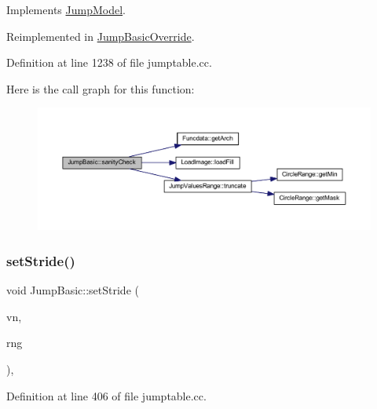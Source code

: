 Implements \mbox{\hyperlink{class_jump_model_a76a52bf3311e9d97a61d1117f6de1b0a}{Jump\+Model}}.



Reimplemented in \mbox{\hyperlink{class_jump_basic_override_a050d3faa295ff61d04f1406443ac83b1}{Jump\+Basic\+Override}}.



Definition at line 1238 of file jumptable.\+cc.

Here is the call graph for this function\+:
\nopagebreak
\begin{figure}[H]
\begin{center}
\leavevmode
\includegraphics[width=350pt]{class_jump_basic_a1cba6b6c963e4a70efc439c27e53bd44_cgraph}
\end{center}
\end{figure}
\mbox{\label{class_jump_basic_a3cc7f57027e323fef2d68388cf2c470c}} 
\subsubsection{\texorpdfstring{setStride()}{setStride()}}
{\footnotesize\ttfamily void Jump\+Basic\+::set\+Stride (\begin{DoxyParamCaption}\item[{\mbox{\hyperlink{class_varnode}{Varnode}} $\ast$}]{vn,  }\item[{\mbox{\hyperlink{class_circle_range}{Circle\+Range}} \&}]{rng }\end{DoxyParamCaption})\hspace{0.3cm}{\ttfamily [static]}, {\ttfamily [protected]}}



Definition at line 406 of file jumptable.\+cc.

